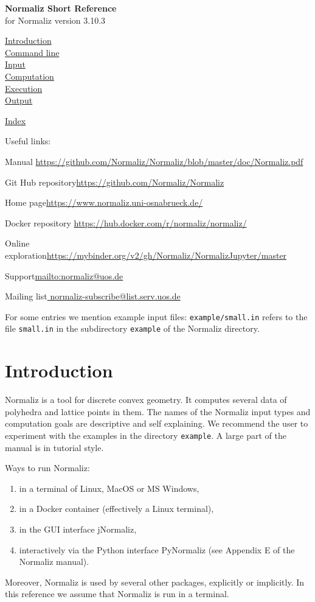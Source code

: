 \documentclass[12pt,a4paper]{scrartcl}
\theoremstyle{definition}
\def\ttt{\texttt}
\def\version{3.10.3}
\def\ContLine#1{\hyperref[#1]{\large #1}\\[6pt]}
\def\SectStart#1{\section{#1}\label{#1}\def\SectHead{#1}}
\def\example#1{\enspace\ttt{\color{blue}example/#1.in}}
\begin{document}
\vspace*{2cm}


\label{Top}
\begin{center}
\Large\textbf{Normaliz Short Reference}\\[12pt] for Normaliz version \version
\end{center}

\ContLine{Introduction}
\ContLine{Command line}
\ContLine{Input}
\ContLine{Computation}
\ContLine{Execution}
\ContLine{Output}
\medskip

\ContLine{Index}

\bigskip

Useful links:\medskip

Manual \enspace \url{https://github.com/Normaliz/Normaliz/blob/master/doc/Normaliz.pdf}\smallskip

Git Hub repository\enspace \url{https://github.com/Normaliz/Normaliz}\smallskip

Home page\enspace \url{https://www.normaliz.uni-osnabrueck.de/}\smallskip

Docker repository \url{https://hub.docker.com/r/normaliz/normaliz/}\smallskip

Online exploration\enspace	\url{https://mybinder.org/v2/gh/Normaliz/NormalizJupyter/master}\smallskip

Support\enspace 	\url{mailto:normaliz@uos.de} \smallskip

Mailing list\enspace \url{ normaliz-subscribe@list.serv.uos.de}

\bigskip\bigskip

For some entries we mention example input files: \example{small} refers to the file \verb|small.in| in the subdirectory \verb|example| of the Normaliz directory.

\newpage

\SectStart{Introduction}

Normaliz is a tool for discrete convex geometry. It computes several data of polyhedra and lattice points in them. The names of the Normaliz input types and computation goals are descriptive and self explaining. We recommend the user to experiment with the examples in  the directory \verb|example|. A large part of the manual is in tutorial style.

Ways to run Normaliz:
\begin{enumerate}
\item in a terminal of Linux, MacOS or MS Windows,
\item in a Docker container (effectively a Linux terminal),
\item in the GUI interface jNormaliz,
\item interactively via the Python interface PyNormaliz (see Appendix E of the Normaliz manual).
\end{enumerate}
Moreover, Normaliz is used by several other packages, explicitly or implicitly. In this reference we assume that Normaliz is run in a terminal.
\end{document}
